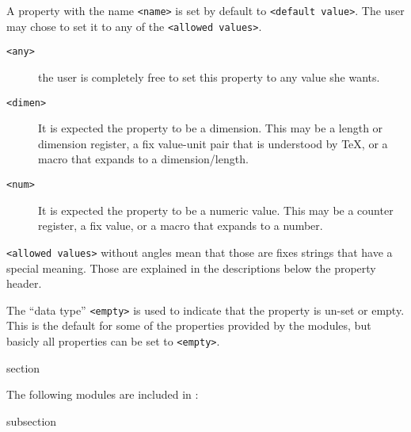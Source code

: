 
A property with the name \texttt{<name>} is set by default to
\texttt{<default value>}. The user may chose to set it to any of the
\texttt{<allowed values>}.
\begin{description}
\item[\texttt{<any>}]  the user is completely free to set this
  property to any value she wants.
\item[\texttt{<dimen>}] It is expected the property to be a
  dimension. This may be a length or dimension register, a fix
  value-unit pair that is understood by \TeX, or a macro that expands
  to a dimension/length.
\item[\texttt{<num>}] It is expected the property to be a numeric
  value. This may be a counter register, a fix value, or a macro that
  expands to a number.
\end{description}
\lstinline{<allowed values>} without angles mean that those are fixes
strings that have a special meaning. Those are explained in the
descriptions below the property header.

The “data type” \texttt{<empty>} is used to indicate that the property
is un-set or empty. This is the default for some of the properties
provided by the {\CoCoTeX} modules, but basicly all properties can
be set to \texttt{<empty>}.


\begin{Heading}{section}
\end{Heading}

The following modules are included in {\CoCoTeX}:

\begin{Heading}{subsection}
\end{Heading}

